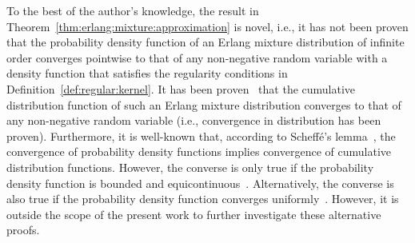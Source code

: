 \begin{remark}
	To the best of the author's knowledge, the result in Theorem~\ref{thm:erlang:mixture:approximation} is novel, i.e., it has not been proven that the probability density function of an Erlang mixture distribution of infinite order converges pointwise to that of any non-negative random variable with a density function that satisfies the regularity conditions in Definition~\ref{def:regular:kernel}. It has been proven~\cite{Cossette:etal:2016, Tijms:1995} that the cumulative distribution function of such an Erlang mixture distribution converges to that of any non-negative random variable (i.e., convergence in distribution has been proven).
	Furthermore, it is well-known that, according to Scheff{\'{e}}'s lemma~\cite{Scheffe:1947}, the convergence of probability density functions implies convergence of cumulative distribution functions. However, the converse is only true if the probability density function is bounded and equicontinuous~\cite{Boos:1985, Sweeting:1986}. Alternatively, the converse is also true if the probability density function converges uniformly~\cite{Rudin:1976}. However, it is outside the scope of the present work to further investigate these alternative proofs.
\end{remark}
